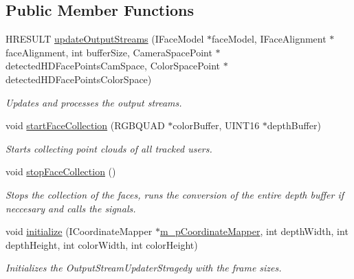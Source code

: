 \subsection*{Public Member Functions}
\begin{DoxyCompactItemize}
\item 
H\+R\+E\+S\+U\+L\+T \hyperlink{class_colored_output_stream_updater_a5fde62c28b46d9113c06f9b317097797}{update\+Output\+Streams} (I\+Face\+Model $\ast$face\+Model, I\+Face\+Alignment $\ast$face\+Alignment, int buffer\+Size, Camera\+Space\+Point $\ast$detected\+H\+D\+Face\+Points\+Cam\+Space, Color\+Space\+Point $\ast$detected\+H\+D\+Face\+Points\+Color\+Space)
\begin{DoxyCompactList}\small\item\em Updates and processes the output streams. \end{DoxyCompactList}\item 
void \hyperlink{class_colored_output_stream_updater_a2b786514c791f56b9d30313d6bf092a5}{start\+Face\+Collection} (R\+G\+B\+Q\+U\+A\+D $\ast$color\+Buffer, U\+I\+N\+T16 $\ast$depth\+Buffer)
\begin{DoxyCompactList}\small\item\em Starts collecting point clouds of all tracked users. \end{DoxyCompactList}\item 
\hypertarget{class_colored_output_stream_updater_ad42020a4b88ef004d81fe7769d0af54b}{}void \hyperlink{class_colored_output_stream_updater_ad42020a4b88ef004d81fe7769d0af54b}{stop\+Face\+Collection} ()\label{class_colored_output_stream_updater_ad42020a4b88ef004d81fe7769d0af54b}

\begin{DoxyCompactList}\small\item\em Stops the collection of the faces, runs the conversion of the entire depth buffer if neccesary and calls the signals. \end{DoxyCompactList}\item 
void \hyperlink{class_colored_output_stream_updater_a4120a90878331011a523723430779c56}{initialize} (I\+Coordinate\+Mapper $\ast$\hyperlink{class_output_streams_updater_stragedy_a3526d196182b8231f73ef97c49982579}{m\+\_\+p\+Coordinate\+Mapper}, int depth\+Width, int depth\+Height, int color\+Width, int color\+Height)
\begin{DoxyCompactList}\small\item\em Initializes the Output\+Stream\+Updater\+Stragedy with the frame sizes. \end{DoxyCompactList}\end{DoxyCompactItemize}
